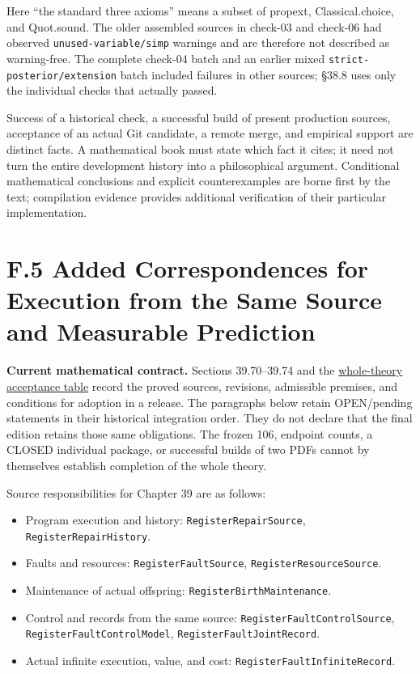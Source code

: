 \documentclass[
  english,
  11pt,
  oneside]{book}
\providecommand{\tightlist}{%
  \setlength{\itemsep}{0pt}\setlength{\parskip}{0pt}}
\begin{document}
Here ``the standard three axioms'' means a subset of propext, Classical.choice, and Quot.sound. The older assembled sources in check-03 and check-06 had observed \nolinkurl{unused-variable/simp} warnings and are therefore not described as warning-free. The complete check-04 batch and an earlier mixed \nolinkurl{strict-posterior/extension} batch included failures in other sources; §38.8 uses only the individual checks that actually passed.

Success of a historical check, a successful build of present production sources, acceptance of an actual Git candidate, a remote merge, and empirical support are distinct facts. A mathematical book must state which fact it cites; it need not turn the entire development history into a philosophical argument. Conditional mathematical conclusions and explicit counterexamples are borne first by the text; compilation evidence provides additional verification of their particular implementation.

\section{F.5 Added Correspondences for Execution from the Same Source and Measurable Prediction}\label{f.5-added-correspondences-for-execution-from-the-same-source-and-measurable-prediction}

\textbf{Current mathematical contract.} Sections 39.70--39.74 and the \href{../formalization/ueot-core/docs/compression/theory_completion/unified_closure/whole_theory_formal_closure_v1/FINAL_ACCEPTANCE.md}{whole-theory acceptance table} record the proved sources, revisions, admissible premises, and conditions for adoption in a release. The paragraphs below retain OPEN/pending statements in their historical integration order. They do not declare that the final edition retains those same obligations. The frozen 106, endpoint counts, a CLOSED individual package, or successful builds of two PDFs cannot by themselves establish completion of the whole theory.

Source responsibilities for Chapter 39 are as follows:

\begin{itemize}
\tightlist
\item
  Program execution and history: \nolinkurl{RegisterRepairSource}, \nolinkurl{RegisterRepairHistory}.
\item
  Faults and resources: \nolinkurl{RegisterFaultSource}, \nolinkurl{RegisterResourceSource}.
\item
  Maintenance of actual offspring: \nolinkurl{RegisterBirthMaintenance}.
\item
  Control and records from the same source: \nolinkurl{RegisterFaultControlSource}, \nolinkurl{RegisterFaultControlModel}, \nolinkurl{RegisterFaultJointRecord}.
\item
  Actual infinite execution, value, and cost: \nolinkurl{RegisterFaultInfiniteRecord}.
\end{itemize}
\end{document}

